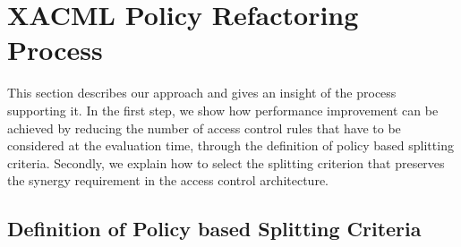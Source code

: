 \section{XACML Policy Refactoring Process} \label{sec:approach}
This section describes our approach and gives an insight of the process supporting it. In the first step, we show how performance improvement can be achieved by
reducing the number of access control rules that have to be considered at the evaluation time, through the definition of policy based splitting criteria. 
Secondly, we explain how to select the splitting criterion that preserves the synergy requirement in the access control architecture.
\subsection{Definition of Policy based Splitting Criteria}



